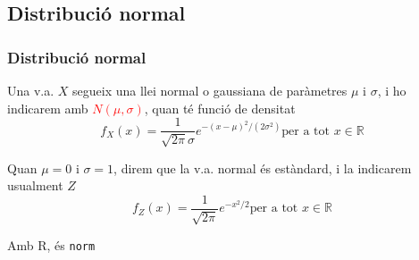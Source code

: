 \documentclass[12pt,t]{beamer}\usepackage[]{graphicx}\usepackage[]{color}
\newcommand{\red}[1]{\textcolor{red}{#1}}
\newcommand{\blue}[1]{\textcolor{blue}{#1}}
\renewcommand{\emph}[1]{{\color{red}#1}}
\newcommand{\RR}{\mathbb{R}}
\renewcommand{\leq}{\leqslant}
\renewcommand{\geq}{\geqslant}
\theoremstyle{plain}
\theoremstyle{definition}
\begin{document}
%
%
%
%
%
%
%
%
%
%
%
%
%
%
%
%
%
%



\subsection{Distribució  normal}

\begin{frame}
\frametitle{Distribució normal}
Una v.a. $X$ segueix una \emph{llei normal} o \emph{gaussiana} de
paràmetres $\mu$ i $\sigma$, i ho indicarem amb \red{$N(\mu,\sigma)$}, quan té funció de densitat $$
f_{X}(x)=\frac{1}{\sqrt{2\pi}\sigma} e^{{-(x-\mu)^2}/{(2\sigma^{2})}} \mbox{
per a tot } x\in \RR
$$
\bigskip

Quan $\mu=0$ i $\sigma=1$, direm que la v.a. normal és \emph{estàndard}, i la indicarem usualment $Z$
$$
f_{Z}(x)=\frac{1}{\sqrt{2\pi}} e^{ -x^2/2} \mbox{
per a tot } x\in \RR
$$

Amb R, és \texttt{norm}
\end{frame}
\end{document}
